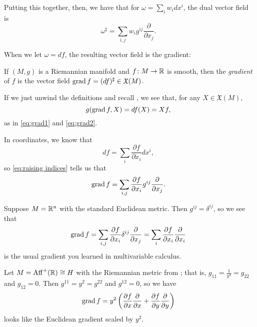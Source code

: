 Putting this together, then, we have that for $\omega = \sum_i w_i dx^i$, the dual vector field is
\begin{equation}\label{eq:raising indices}
	\omega^\sharp = \sum_{i,j} w_i g^{ij} \frac{\partial}{\partial x_j}.
\end{equation}

When we let $\omega = df$, the resulting vector field is the gradient:

\begin{definition}\label{def:gradient}
	If $(M,g)$ is a Riemannian manifold and $f \colon\thinspace\! M \to \mathbb{R}$ is smooth, then the \emph{gradient} of $f$ is the vector field $\operatorname{grad} f = (df)^\sharp \in \mathfrak{X}(M)$.
\end{definition}

If we just unwind the definitions and recall , we see that, for any $X \in \mathfrak{X}(M)$,
\[
	g(\operatorname{grad} f, X) = df(X) = Xf,
\]
as in \eqref{eq:grad1} and \eqref{eq:grad2}.

In coordinates, we know that 
\[
	df = \sum_i \frac{\partial f}{\partial x_i} dx^i,
\]
so \eqref{eq:raising indices} tells us that
\[
	\operatorname{grad} f = \sum_{i,j} \frac{\partial f}{\partial x_i} g^{ij} \frac{\partial}{\partial x_j}.
\]

\begin{example}
	Suppose $M=\mathbb{R}^n$ with the standard Euclidean metric. Then $g^{ij} = \delta^{ij}$, so we see that
	\[
		\operatorname{grad} f = \sum_{i,j} \frac{\partial f}{\partial x_i} \delta^{ij} \frac{\partial}{\partial x_j} = \sum_i \frac{\partial f}{\partial x_i} \frac{\partial}{\partial x_i}
	\]
	is the usual gradient you learned in multivariable calculus.
\end{example}

\begin{example}
	Let $M = \operatorname{Aff}^+(\mathbb{R}) \cong H$ with the Riemannian metric from ; that is, $g_{11} = \frac{1}{y^2} = g_{22}$ and $g_{12} = 0$. Then $g^{11} = y^2 = g^{22}$ and $g^{12} = 0$, so we have
	\[
		\operatorname{grad} f = y^2 \left(\frac{\partial f}{\partial x} \frac{\partial}{\partial x} + \frac{\partial f}{\partial y} \frac{\partial}{\partial y} \right)
	\]
	looks like the Euclidean gradient scaled by $y^2$.
\end{example}


